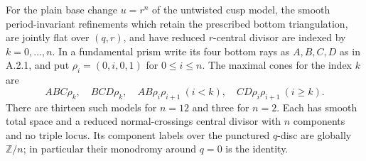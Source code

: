 \begin{proposition}\label{push:src:B.2.1}\label{push:B21}
For the plain base change $u=r^n$ of the untwisted cusp
model, the smooth period-invariant refinements which
retain the prescribed bottom triangulation, are jointly
flat over $(q,r)$, and have reduced $r$-central divisor
are indexed by $k=0,\ldots,n$. In a fundamental prism
write its four bottom rays as $A,B,C,D$ as in A.2.1,
and put $\rho_i=(0,i,0,1)$ for $0\leq i\leq n$.
The maximal cones for the index $k$ are
\[
 ABC\rho_k,\quad BCD\rho_k,\quad
 AB\rho_i\rho_{i+1}\ (i<k),\quad
 CD\rho_i\rho_{i+1}\ (i\geq k).
\]
There are thirteen such models for $n=12$ and three
for $n=2$. Each has smooth total space and a reduced
normal-crossings central divisor with $n$ components
and no triple locus. Its component labels over the
punctured $q$-disc are globally $\mathbb Z/n$; in
particular their monodromy around $q=0$ is the identity.
\end{proposition}
